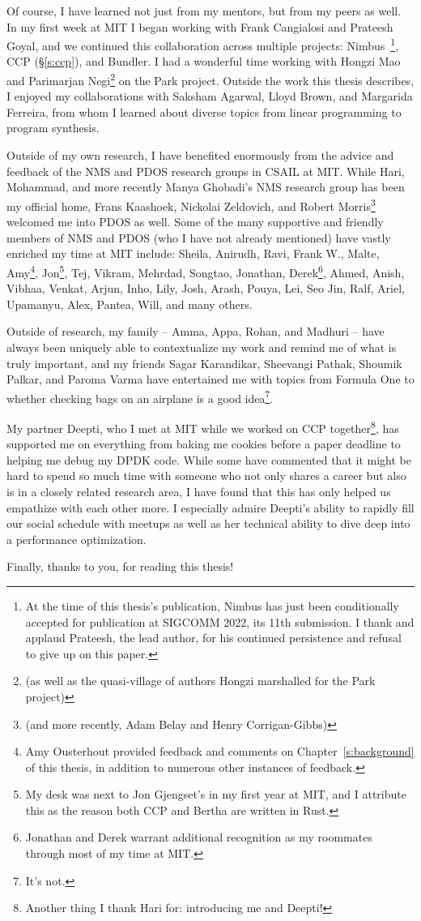 Of course, I have learned not just from my mentors, but from my peers as well. In my first week at MIT I began working with Frank Cangialosi and Prateesh Goyal, and we continued this collaboration across multiple projects: Nimbus~\cite{nimbus-arxiv}\footnote{At the time of this thesis's publication, Nimbus has just been conditionally accepted for publication at SIGCOMM 2022, its 11th submission. I thank and applaud Prateesh, the lead author, for his continued persistence and refusal to give up on this
paper.}, CCP (\S\ref{s:ccp}), and Bundler. I had a wonderful time working with Hongzi Mao and Parimarjan Negi\footnote{(as well as the quasi-village of authors Hongzi marshalled for the Park project)} on the Park project. 
Outside the work this thesis describes, I enjoyed my collaborations with Saksham Agarwal, Lloyd Brown, and Margarida Ferreira, from whom I learned about diverse topics from linear programming to program synthesis.

Outside of my own research, I have benefited enormously from the advice and feedback of the NMS and PDOS research groups in CSAIL at MIT. While Hari, Mohammad, and more recently Manya Ghobadi's NMS research group has been my official home, Frans Kaashoek, Nickolai Zeldovich, and Robert Morris\footnote{(and more recently, Adam Belay and Henry Corrigan-Gibbs)} welcomed me into PDOS as well. Some of the many supportive and friendly members of NMS and PDOS (who I have not already mentioned) have
vastly enriched my time at MIT include:
Sheila, Anirudh, Ravi, Frank W., Malte, Amy\footnote{Amy Ousterhout provided feedback and comments on Chapter~\ref{s:background} of this thesis, in addition to numerous other instances of feedback.}, Jon\footnote{My desk was next to Jon Gjengset's in my first year at MIT, and I attribute this as the reason both CCP and Bertha are written in Rust.}, Tej, Vikram, Mehrdad, Songtao, Jonathan, Derek\footnote{Jonathan and Derek warrant additional recognition as my roommates through most of my time at MIT.}, Ahmed, Anish, Vibhaa, Venkat, Arjun, Inho, Lily, Josh, Arash, Pouya, Lei, Seo Jin, Ralf, Ariel, Upamanyu, Alex, Pantea, Will, and many others.

Outside of research, my family -- Amma, Appa, Rohan, and Madhuri -- have always been uniquely able to contextualize my work and remind me of what is truly important, and my friends Sagar Karandikar, Sheevangi Pathak, Shoumik Palkar, and Paroma Varma have entertained me with topics from Formula One to whether checking bags on an airplane is a good idea\footnote{It's not.}.

My partner Deepti, who I met at MIT while we worked on CCP together\footnote{Another thing I thank Hari for: introducing me and Deepti!}, has supported me on everything from baking me cookies before a paper deadline to helping me debug my DPDK code. While some have commented that it might be hard to spend so much time with someone who not only shares a career but also is in a closely related research area, I have found that this has only helped us empathize with each other more.
I especially admire Deepti's ability to rapidly fill our social schedule with meetups as well as her technical ability to dive deep into a performance optimization.

Finally, thanks to you, for reading this thesis!
